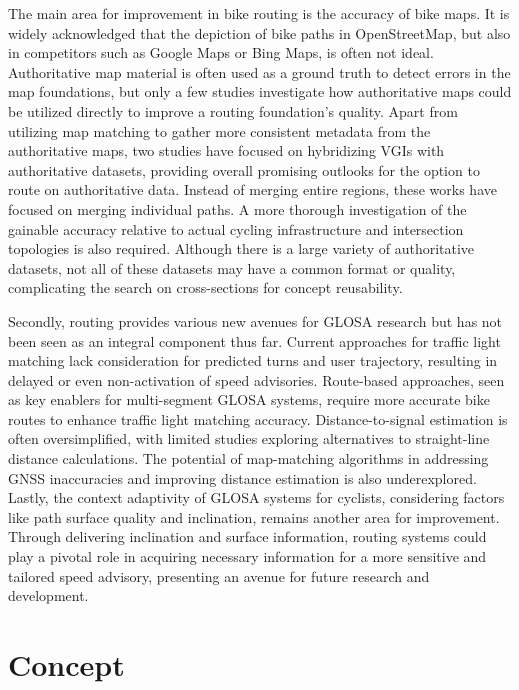 \begin{Summary}
The main area for improvement in bike routing is the accuracy of bike maps. It is widely acknowledged that the depiction of bike paths in OpenStreetMap, but also in competitors such as Google Maps or Bing Maps, is often not ideal. Authoritative map material is often used as a ground truth to detect errors in the map foundations, but only a few studies investigate how authoritative maps could be utilized directly to improve a routing foundation's quality. Apart from utilizing map matching to gather more consistent metadata from the authoritative maps, two studies have focused on hybridizing VGIs with authoritative datasets, providing overall promising outlooks for the option to route on authoritative data. Instead of merging entire regions, these works have focused on merging individual paths. A more thorough investigation of the gainable accuracy relative to actual cycling infrastructure and intersection topologies is also required. Although there is a large variety of authoritative datasets, not all of these datasets may have a common format or quality, complicating the search on cross-sections for concept reusability.

Secondly, routing provides various new avenues for GLOSA research but has not been seen as an integral component thus far. Current approaches for traffic light matching lack consideration for predicted turns and user trajectory, resulting in delayed or even non-activation of speed advisories. Route-based approaches, seen as key enablers for multi-segment GLOSA systems, require more accurate bike routes to enhance traffic light matching accuracy. Distance-to-signal estimation is often oversimplified, with limited studies exploring alternatives to straight-line distance calculations. The potential of map-matching algorithms in addressing GNSS inaccuracies and improving distance estimation is also underexplored. Lastly, the context adaptivity of GLOSA systems for cyclists, considering factors like path surface quality and inclination, remains another area for improvement. Through delivering inclination and surface information, routing systems could play a pivotal role in acquiring necessary information for a more sensitive and tailored speed advisory, presenting an avenue for future research and development.
\end{Summary}

\section{Concept}

